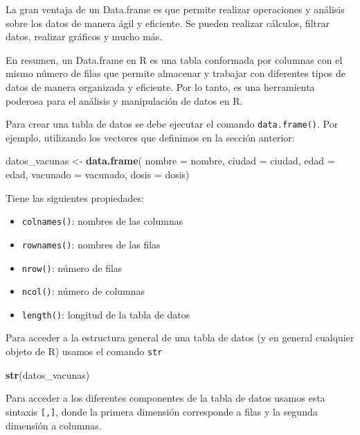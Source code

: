 \documentclass[
]{article}
\newenvironment{Shaded}{\begin{snugshade}}{\end{snugshade}}
\newcommand{\AttributeTok}[1]{\textcolor[rgb]{0.13,0.29,0.53}{#1}}
\newcommand{\FunctionTok}[1]{\textcolor[rgb]{0.13,0.29,0.53}{\textbf{#1}}}
\newcommand{\NormalTok}[1]{#1}
\newcommand{\OtherTok}[1]{\textcolor[rgb]{0.56,0.35,0.01}{#1}}
\providecommand{\tightlist}{%
  \setlength{\itemsep}{0pt}\setlength{\parskip}{0pt}}
\begin{document}
La gran ventaja de un Data.frame es que permite realizar operaciones y
análisis sobre los datos de manera ágil y eficiente. Se pueden realizar
cálculos, filtrar datos, realizar gráficos y mucho más.

En resumen, un Data.frame en R es una tabla conformada por columnas con
el mismo número de filas que permite almacenar y trabajar con diferentes
tipos de datos de manera organizada y eficiente. Por lo tanto, es una
herramienta poderosa para el análisis y manipulación de datos en R.

Para crear una tabla de datos se debe ejecutar el comando
\texttt{data.frame()}. Por ejemplo, utilizando los vectores que
definimos en la sección anterior:

\begin{Shaded}
\begin{Highlighting}[]
\NormalTok{datos\_vacunas }\OtherTok{\textless{}{-}} \FunctionTok{data.frame}\NormalTok{(}
  \AttributeTok{nombre =}\NormalTok{ nombre, }
  \AttributeTok{ciudad =}\NormalTok{ ciudad,}
  \AttributeTok{edad =}\NormalTok{ edad,}
  \AttributeTok{vacunado =}\NormalTok{ vacunado,}
  \AttributeTok{dosis =}\NormalTok{ dosis)}
\end{Highlighting}
\end{Shaded}

Tiene las siguientes propiedades:

\begin{itemize}
\tightlist
\item
  \texttt{colnames()}: nombres de las columnas
\item
  \texttt{rownames()}: nombres de las filas
\item
  \texttt{nrow()}: número de filas
\item
  \texttt{ncol()}: número de columnas
\item
  \texttt{length()}: longitud de la tabla de datos
\end{itemize}

Para acceder a la estructura general de una tabla de datos (y en general
cualquier objeto de R) usamos el comando \texttt{str}

\begin{Shaded}
\begin{Highlighting}[]
\FunctionTok{str}\NormalTok{(datos\_vacunas)}
\end{Highlighting}
\end{Shaded}

Para acceder a los diferentes componentes de la tabla de datos usamos
esta sintaxis \texttt{{[},{]}}, donde la primera dimensión corresponde a
filas y la segunda dimensión a columnas.
\end{document}
